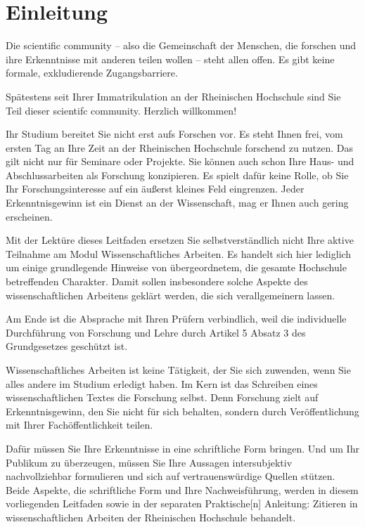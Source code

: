 \chapter*{Einleitung}
\label{chap:einleitung}

Die scientific community – also die Gemeinschaft der Menschen, die forschen und ihre Erkenntnisse mit anderen teilen wollen – steht allen offen. Es gibt keine formale, exkludierende Zugangsbarriere.

Spätestens seit Ihrer Immatrikulation an der Rheinischen Hochschule sind Sie Teil dieser scientifc community. Herzlich willkommen!

Ihr Studium bereitet Sie nicht erst aufs Forschen vor. Es steht Ihnen frei, vom ersten Tag an Ihre Zeit an der Rheinischen Hochschule forschend zu nutzen. Das gilt nicht nur für Seminare oder Projekte. Sie können auch schon Ihre Haus- und Abschlussarbeiten als Forschung konzipieren. Es spielt dafür keine Rolle, ob Sie Ihr Forschungsinteresse auf ein äußerst kleines Feld eingrenzen. Jeder Erkenntnisgewinn ist ein Dienst an der Wissenschaft, mag er Ihnen auch gering erscheinen.

Mit der Lektüre dieses Leitfaden ersetzen Sie selbstverständlich nicht Ihre aktive Teilnahme am Modul Wissenschaftliches Arbeiten. Es handelt sich hier lediglich um einige grundlegende Hinweise von übergeordnetem, die gesamte Hochschule betreffenden Charakter. Damit sollen insbesondere solche Aspekte des wissenschaftlichen Arbeitens geklärt werden, die sich verallgemeinern lassen.

Am Ende ist die Absprache mit Ihren Prüfern verbindlich, weil die individuelle Durchführung von Forschung und Lehre durch Artikel 5 Absatz 3 des Grundgesetzes geschützt ist.

Wissenschaftliches Arbeiten ist keine Tätigkeit, der Sie sich zuwenden, wenn Sie alles andere im Studium erledigt haben. Im Kern ist das Schreiben eines wissenschaftlichen Textes die Forschung selbst. Denn Forschung zielt auf Erkenntnisgewinn, den Sie nicht für sich behalten, sondern durch Veröffentlichung mit Ihrer Fachöffentlichkeit teilen.

Dafür müssen Sie Ihre Erkenntnisse in eine schriftliche Form bringen. Und um Ihr Publikum zu überzeugen, müssen Sie Ihre Aussagen intersubjektiv nachvollziehbar formulieren und sich auf vertrauenswürdige Quellen stützen. Beide Aspekte, die schriftliche Form und Ihre Nachweisführung, werden in diesem vorliegenden Leitfaden sowie in der separaten Praktische[n] Anleitung: Zitieren in wissenschaftlichen Arbeiten der Rheinischen Hochschule behandelt.


